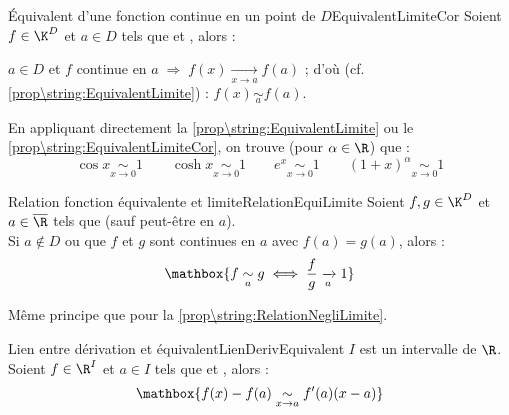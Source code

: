 \documentclass[12pt,a4paper]{report}
\begin{document}

\begin{corollaire}{\'Equivalent d'une fonction continue en un point de $D$}{EquivalentLimiteCor}
    Soient $f \in \K^D$ et $a \in D$ tels que  et , alors : \hfill {} \hspace*{\fill}
\end{corollaire}

\begin{demo}
    $a \in D$ et $f$ continue en $a \; \Longrightarrow \; f(x) \xrightarrow[x \to a]{} f(a)$ ; d'où (cf. \cref{prop\string:EquivalentLimite}) : $f(x) \underset{a}{\sim} f(a)$.
\end{demo}

\begin{exemple}[Exemples]
    En appliquant directement la \cref{prop\string:EquivalentLimite} ou le \cref{prop\string:EquivalentLimiteCor}, on trouve (pour $\alpha \in \R$) que :
    $$ \cos x \underset{x \to 0}{\sim} 1 \qquad \cosh x \underset{x \to 0}{\sim} 1 \qquad e^x \underset{x \to 0}{\sim} 1 \qquad (1+x)^\alpha \underset{x \to 0}{\sim} 1 $$
\end{exemple}

\begin{proposition}{Relation fonction équivalente et limite}{RelationEquiLimite}
    Soient $f, g \in \K^D$ et $a \in \overline{\R}$ tels que  (sauf peut-être en $a$).\\
    Si $a \not\in D$ ou que $f$ et $g$ sont continues en $a$ avec $f(a) = g(a)$, alors :
    $$
    \mathbox{f \underset{a}{\sim} g \; \Longleftrightarrow \; \dfrac{f}{g} \xrightarrow[a]{} 1}
    $$
\end{proposition}


\begin{demo}
    Même principe que pour la \cref{prop\string:RelationNegliLimite}.
\end{demo}

\begin{proposition}{Lien entre dérivation et équivalent}{LienDerivEquivalent}
    $I$ est un intervalle de $\R$. Soient $f \in \R^I$ et $a \in I$ tels que  et , alors :
    $$ \mathbox{f(x) - f(a) \underset{x \to a}{\sim} f'(a) (x-a)} $$
\end{proposition}
\end{document}

